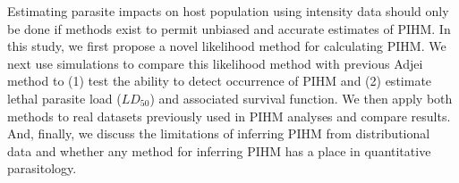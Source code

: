 \documentclass[12pt, a4paper]{article}
\begin{document}
Estimating parasite impacts on host population using intensity data should only
be done if methods exist to permit unbiased and accurate estimates of PIHM. In
this study, we first propose a novel likelihood method for calculating PIHM. We
next use simulations to compare this likelihood method with previous Adjei
method to (1) test the ability to detect occurrence of PIHM and (2) estimate
lethal parasite load ($LD_{50}$) and associated survival function.  We then
apply both methods to real datasets previously used in PIHM analyses and
compare results. And, finally, we discuss the limitations of inferring PIHM
from distributional data and whether any method for inferring PIHM has a place
in quantitative parasitology.





\end{document}
